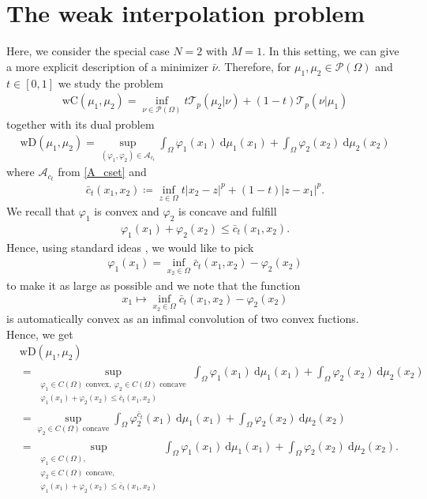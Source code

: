 \documentclass[letterpaper]{amsart}
\newcommand{\dd}{\mathrm{d}}
\theoremstyle{definition}
\begin{document}
\section{The weak interpolation problem}
Here, we consider the special case $N=2$ with $M=1$.
In this setting, we can give a more explicit description of a minimizer $\bar\nu$. Therefore, for $\mu_1,\mu_2\in\mathcal P(\Omega)$ and $t\in[0,1]$ we study the problem
\begin{gather}\label{weakmidpointproblemN2}
	\text{wC}(\mu_1,\mu_2)=\inf_{\nu\in\mathcal P(\Omega)}t\mathcal T_p(\mu_2|\nu)+(1-t)\mathcal T_p(\nu|\mu_1)
\end{gather}
together with its dual problem
\begin{gather}\label{weakdualproblemN2}
	\text{wD}(\mu_1,\mu_2)=\sup_{(\varphi_1,\varphi_2)\in\mathcal A_{\bar c_t}}\int_\Omega\varphi_1(x_1)\ \dd\mu_1(x_1)+\int_\Omega\varphi_2(x_2)\ \dd\mu_2(x_2)
\end{gather}
where $\mathcal A_{c_t}$ from \eqref{A_cset} and
\begin{gather*}
	\bar c_t(x_1,x_2)\coloneqq \inf_{z\in\Omega}t|x_2-z|^p+(1-t)|z-x_1|^p.
\end{gather*}
We recall that $\varphi_1$ is convex and $\varphi_2$ is concave and fulfill
\begin{gather*}
	\varphi_1(x_1)+\varphi_2(x_2)\leq\bar c_t(x_1,x_2).
\end{gather*}
Hence, using standard ideas \cite[p 11]{santambrogio2015}, we would like to pick
\begin{gather*}
	\varphi_1(x_1)=\inf_{x_2\in\Omega}\bar c_t(x_1,x_2)-\varphi_2(x_2)
\end{gather*}
to make it as large as possible and we note that the function
$$x_1\mapsto\inf_{x_2\in\Omega}\bar c_t(x_1,x_2)-\varphi_2(x_2)$$ is automatically convex as an infimal convolution of two convex fuctions.\\
Hence, we get
\begin{align*}
	&\text{wD}(\mu_1,\mu_2)\\
	&=\sup_{\substack{\varphi_1\in C(\Omega)\text{ convex},\
			\varphi_2\in C(\Omega)\text{ concave}\\
			\varphi_1(x_1)+\varphi_2(x_2)\leq\bar c_t(x_1,x_2)}}\int_\Omega\varphi_1(x_1)\ \dd\mu_1(x_1)+\int_\Omega\varphi_2(x_2)\ \dd\mu_2(x_2)\\
	&=\sup_{\varphi_2\in C(\Omega)\text{ concave}}\int_\Omega\varphi_2^{\bar c_t}(x_1)\ \dd\mu_1(x_1)+\int_\Omega\varphi_2(x_2)\ \dd\mu_2(x_2)\\
	&=\sup_{\substack{\varphi_1\in C(\Omega),\\
			\varphi_2\in C(\Omega)\text{ concave},\\
			\varphi_1(x_1)+\varphi_2(x_2)\leq\bar c_t(x_1,x_2)}}\int_\Omega\varphi_1(x_1)\ \dd\mu_1(x_1)+\int_\Omega\varphi_2(x_2)\ \dd\mu_2(x_2).
\end{align*}
\end{document}
